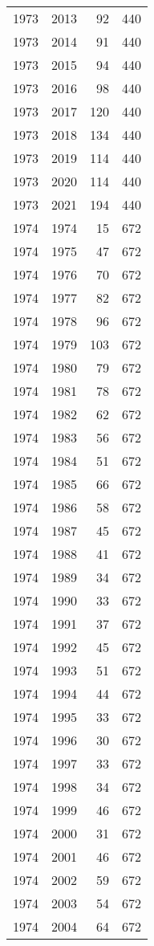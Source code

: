 \documentclass[
  10pt,
  letterpaper,
  DIV=11,
  numbers=noendperiod,
  twoside]{scrartcl}
\begin{document}
\begin{longtable}[]{@{}rrrr@{}}
1973 & 2013 & 92 & 440 \\
1973 & 2014 & 91 & 440 \\
1973 & 2015 & 94 & 440 \\
1973 & 2016 & 98 & 440 \\
1973 & 2017 & 120 & 440 \\
1973 & 2018 & 134 & 440 \\
1973 & 2019 & 114 & 440 \\
1973 & 2020 & 114 & 440 \\
1973 & 2021 & 194 & 440 \\
1974 & 1974 & 15 & 672 \\
1974 & 1975 & 47 & 672 \\
1974 & 1976 & 70 & 672 \\
1974 & 1977 & 82 & 672 \\
1974 & 1978 & 96 & 672 \\
1974 & 1979 & 103 & 672 \\
1974 & 1980 & 79 & 672 \\
1974 & 1981 & 78 & 672 \\
1974 & 1982 & 62 & 672 \\
1974 & 1983 & 56 & 672 \\
1974 & 1984 & 51 & 672 \\
1974 & 1985 & 66 & 672 \\
1974 & 1986 & 58 & 672 \\
1974 & 1987 & 45 & 672 \\
1974 & 1988 & 41 & 672 \\
1974 & 1989 & 34 & 672 \\
1974 & 1990 & 33 & 672 \\
1974 & 1991 & 37 & 672 \\
1974 & 1992 & 45 & 672 \\
1974 & 1993 & 51 & 672 \\
1974 & 1994 & 44 & 672 \\
1974 & 1995 & 33 & 672 \\
1974 & 1996 & 30 & 672 \\
1974 & 1997 & 33 & 672 \\
1974 & 1998 & 34 & 672 \\
1974 & 1999 & 46 & 672 \\
1974 & 2000 & 31 & 672 \\
1974 & 2001 & 46 & 672 \\
1974 & 2002 & 59 & 672 \\
1974 & 2003 & 54 & 672 \\
1974 & 2004 & 64 & 672 \\

\end{longtable}
\end{document}
